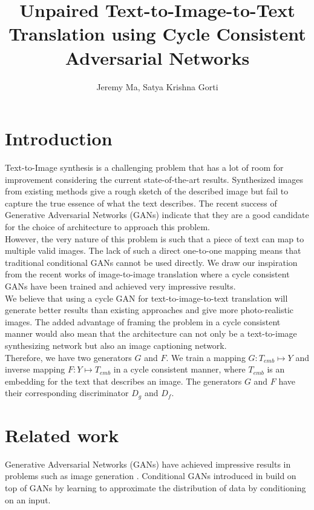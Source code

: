 \documentclass[]{article}
\title{Unpaired Text-to-Image-to-Text Translation using Cycle Consistent Adversarial Networks}
\author{Jeremy Ma, Satya Krishna Gorti}
\date{}
\begin{document}
\maketitle


\section{Introduction}

Text-to-Image synthesis is a challenging problem that has a lot of room for improvement considering the current state-of-the-art results. Synthesized images from existing methods give a rough sketch of the described image but fail to capture the true essence of what the text describes. The recent success of Generative Adversarial Networks (GANs) \cite{goodfellow2014generative} indicate that they are a good candidate for the choice of architecture to approach this problem.
\\

However, the very nature of this problem is such that a piece of text can map to multiple valid images. The lack of such a direct one-to-one mapping means that traditional conditional GANs \cite{mirza2014conditional} cannot be used directly. We draw our inspiration from the recent works of image-to-image translation \cite{liu2017unsupervised}\cite{zhu2017unpaired} where a cycle consistent GANs have been trained and achieved very impressive results.
\\

We believe that using a cycle GAN for text-to-image-to-text translation will generate better results than existing approaches and give more photo-realistic images. The added advantage of framing the problem in a cycle consistent manner would also mean that the architecture can not only be a text-to-image synthesizing network but also an image captioning network.
\\

Therefore, we have two generators $G$ and $F$. We train a mapping $G: T_{emb} \mapsto Y$ and inverse mapping $F: Y \mapsto T_{emb}$ in a cycle consistent manner, where $T_{emb}$ is an embedding for the text that describes an image. The generators $G$ and $F$ have their corresponding discriminator $D_g$ and $D_f$.

\section{Related work}

Generative Adversarial Networks (GANs) have achieved impressive results in problems such as image generation \cite{DBLP:journals/corr/RadfordMC15}. Conditional GANs introduced in \cite{mirza2014conditional} build on top of GANs by learning to approximate the distribution of data by conditioning on an input.
\\
\end{document}
